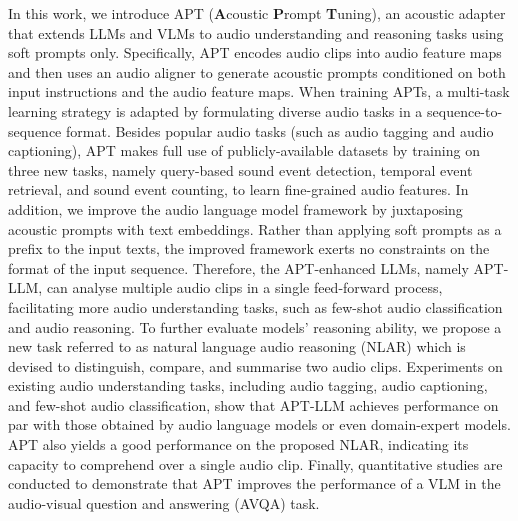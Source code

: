 In this work, we introduce APT (\textbf{A}coustic \textbf{P}rompt \textbf{T}uning), an acoustic adapter that extends LLMs and VLMs to audio understanding and reasoning tasks using soft prompts only. Specifically, APT encodes audio clips into audio feature maps and then uses an audio aligner to generate acoustic prompts conditioned on both input instructions and the audio feature maps. When training APTs, a multi-task learning strategy is adapted by formulating diverse audio tasks in a sequence-to-sequence format. Besides popular audio tasks (such as audio tagging and audio captioning), APT makes full use of publicly-available datasets by training on three new tasks, namely query-based sound event detection, temporal event retrieval, and sound event counting, to learn fine-grained audio features. In addition, we improve the audio language model framework by juxtaposing acoustic prompts with text embeddings. Rather than applying soft prompts as a prefix to the input texts, the improved framework exerts no constraints on the format of the input sequence. Therefore, the APT-enhanced LLMs, namely APT-LLM, can analyse multiple audio clips in a single feed-forward process, facilitating more audio understanding tasks, such as few-shot audio classification and audio reasoning. To further evaluate models' reasoning ability, we propose a new task referred to as natural language audio reasoning (NLAR) which is devised to distinguish, compare, and summarise two audio clips. Experiments on existing audio understanding tasks, including audio tagging, audio captioning, and few-shot audio classification, show that APT-LLM achieves performance on par with those obtained by audio language models or even domain-expert models. APT also yields a good performance on the proposed NLAR, indicating its capacity to comprehend over a single audio clip. Finally, quantitative studies are conducted to demonstrate that APT improves the performance of a VLM in the audio-visual question and answering (AVQA) task.

